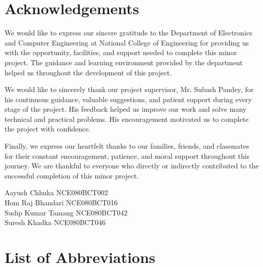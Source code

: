 \documentclass[12pt, a4paper]{report}
\numberwithin{equation}{chapter}
\begin{document}


\setcounter{page}{1}

\chapter*{Acknowledgements}

We would like to express our sincere gratitude to the Department of Electronics and Computer Engineering at National College of Engineering for providing us with the opportunity, facilities, and support needed to complete this minor project. The guidance and learning environment provided by the department helped us throughout the development of this project.

We would like to sincerely thank our project supervisor, Mr. Subash Pandey, for his continuous guidance, valuable suggestions, and patient support during every stage of the project. His feedback helped us improve our work and solve many technical and practical problems. His encouragement motivated us to complete the project with confidence.

Finally, we express our heartfelt thanks to our families, friends, and classmates for their constant encouragement, patience, and moral support throughout this journey. We are thankful to everyone who directly or indirectly contributed to the successful completion of this minor project.

\vspace{2cm}
\noindent
Aayush Chhuka \hfill NCE080BCT002 \\
Hom Raj Bhandari \hfill NCE080BCT016 \\
Sudip Kumar Tamang \hfill NCE080BCT042 \\
Suresh Khadka \hfill NCE080BCT046

\newpage

\tableofcontents
\newpage

\listoffigures
{}
\newpage

\listoftables
{}
\newpage

\chapter*{List of Abbreviations}
\end{document}
